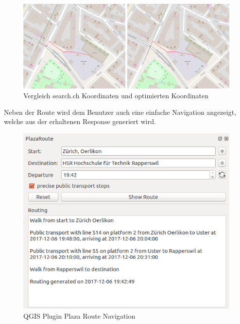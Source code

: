 \begin{figure}[ht]
\centering
\includegraphics[width=1.0\linewidth]{projectdoc/img/precise_public_transport_stops_comparison}
\caption[Vergleich search.ch Koordinaten und optimierten Koordinaten]{Vergleich search.ch Koordinaten und optimierten Koordinaten}
\label{fig:precise_public_transport_stops_comparison}
\end{figure}

Neben der Route wird dem Benutzer auch eine einfache Navigation angezeigt, welche aus der erhaltenen Response generiert wird.  

\begin{figure}[ht]
\centering
\includegraphics[width=0.7\linewidth]{projectdoc/img/qgis_plugin_plaza_route_navigation}
\caption[QGIS Plugin Plaza Route Navigation]{QGIS Plugin Plaza Route Navigation}
\label{fig:qgis_plugin_plaza_route_navigation}
\end{figure}









